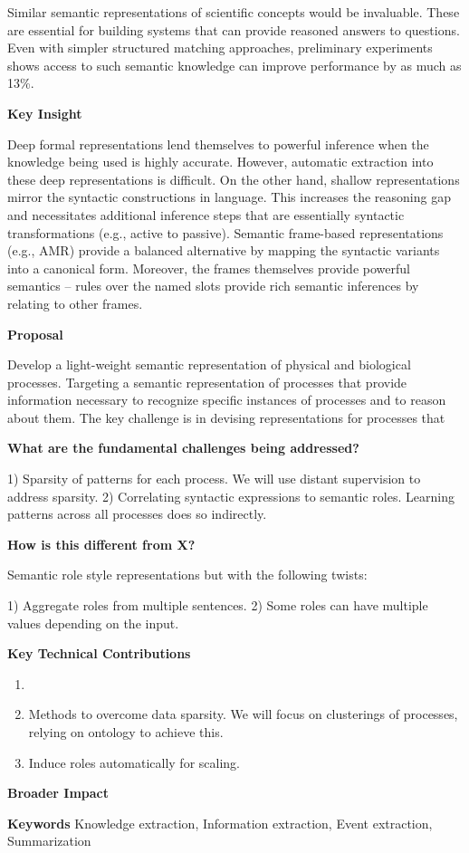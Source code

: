 Similar semantic representations of scientific concepts would be invaluable. These are essential for building systems that can provide reasoned answers to questions. Even with simpler structured matching approaches, preliminary experiments shows access to such semantic knowledge can improve performance by as much as 13\%. 


{\bf Key Insight}

Deep formal representations lend themselves to powerful inference when the knowledge being used is highly accurate. 
However, automatic extraction into these deep representations is difficult. 
On the other hand, shallow representations mirror the syntactic constructions in language. 
This increases the reasoning gap and necessitates additional inference steps that are essentially syntactic transformations (e.g., active to passive).
Semantic frame-based representations (e.g., AMR) provide a balanced alternative by mapping the syntactic variants into a canonical form.
Moreover, the frames themselves provide powerful semantics -- rules over the named slots provide rich semantic inferences by relating to other frames.

{\bf Proposal}

Develop a light-weight semantic representation of physical and biological processes. Targeting a semantic representation of processes that provide information necessary to recognize specific instances of processes and to reason about them. The key challenge is in devising representations for processes that


{\bf What are the fundamental challenges being addressed?}

1) Sparsity of patterns for each process. We will use distant supervision to address sparsity. 
2) Correlating syntactic expressions to semantic roles. Learning patterns across all processes does so indirectly. 

{\bf How is this different from X?}

Semantic role style representations but with the following twists:

1) Aggregate roles from multiple sentences. 
2) Some roles can have multiple values depending on the input. 


{\bf Key Technical Contributions}

\begin{enumerate}

\item 
\item Methods to overcome data sparsity. We will focus on clusterings of processes, relying on ontology to achieve this. 
\item Induce roles automatically for scaling. 

\end{enumerate}


{\bf Broader Impact} 


{\bf Keywords} Knowledge extraction, Information extraction, Event extraction, Summarization

%

